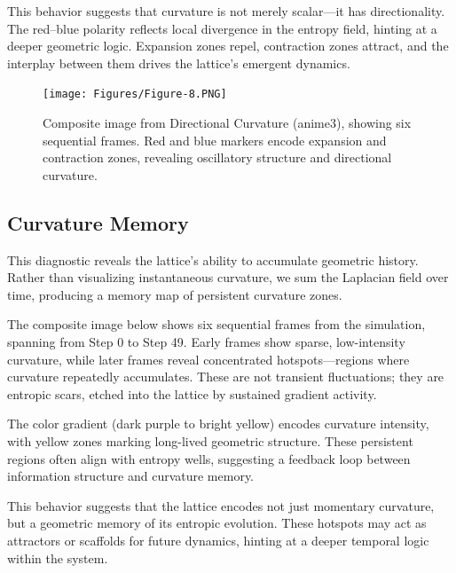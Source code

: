 \documentclass[12pt]{article}
\begin{document}
This behavior suggests that curvature is not merely scalar—it has directionality. The red–blue polarity reflects local divergence in the entropy field, hinting at a deeper geometric logic. Expansion zones repel, contraction zones attract, and the interplay between them drives the lattice’s emergent dynamics.

\begin{figure}[h]
    \centering
    \texttt{[image: Figures/Figure-8.PNG]}
    \caption{Composite image from Directional Curvature (anime3), showing six sequential frames. Red and blue markers encode expansion and contraction zones, revealing oscillatory structure and directional curvature.}
    \label{fig:directional_curvature}
\end{figure}

\subsection{Curvature Memory}

This diagnostic reveals the lattice’s ability to accumulate geometric history. Rather than visualizing instantaneous curvature, we sum the Laplacian field over time, producing a memory map of persistent curvature zones.

The composite image below shows six sequential frames from the simulation, spanning from Step 0 to Step 49. Early frames show sparse, low-intensity curvature, while later frames reveal concentrated hotspots—regions where curvature repeatedly accumulates. These are not transient fluctuations; they are entropic scars, etched into the lattice by sustained gradient activity.

The color gradient (dark purple to bright yellow) encodes curvature intensity, with yellow zones marking long-lived geometric structure. These persistent regions often align with entropy wells, suggesting a feedback loop between information structure and curvature memory.

This behavior suggests that the lattice encodes not just momentary curvature, but a geometric memory of its entropic evolution. These hotspots may act as attractors or scaffolds for future dynamics, hinting at a deeper temporal logic within the system.
\end{document}
